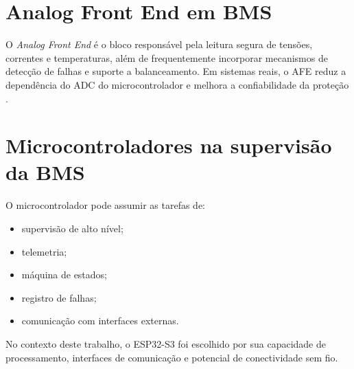 \section{Analog Front End em BMS}

O \textit{Analog Front End} é o bloco responsável pela leitura segura de tensões, correntes e
temperaturas, além de frequentemente incorporar mecanismos de detecção de falhas e suporte a
balanceamento. Em sistemas reais, o AFE reduz a dependência do ADC do microcontrolador e
melhora a confiabilidade da proteção \cite{ti_bq76920,ad_passive_balancing}.

\section{Microcontroladores na supervisão da BMS}

O microcontrolador pode assumir as tarefas de:

\begin{itemize}
  \item supervisão de alto nível;
  \item telemetria;
  \item máquina de estados;
  \item registro de falhas;
  \item comunicação com interfaces externas.
\end{itemize}

No contexto deste trabalho, o ESP32-S3 foi escolhido por sua capacidade de processamento,
interfaces de comunicação e potencial de conectividade sem fio.
